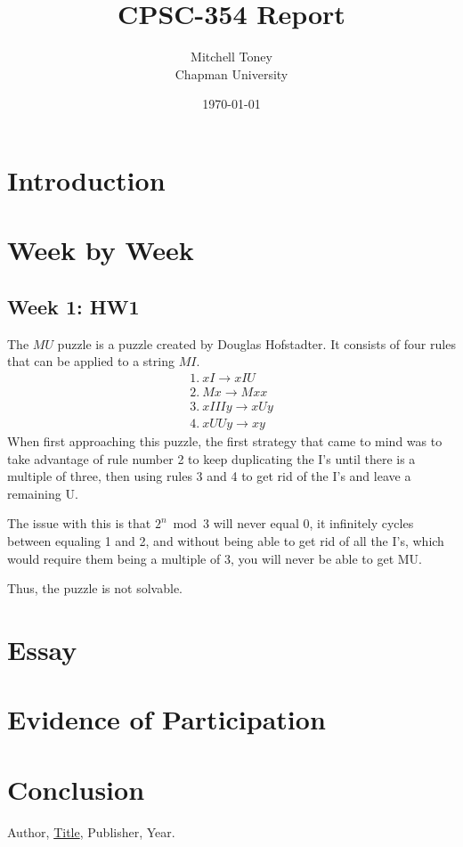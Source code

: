 \documentclass{article}
\title{CPSC-354 Report}
\author{Mitchell Toney  \\ Chapman University}
\date{\today}
\theoremstyle{theorem}
\theoremstyle{definition}
\theoremstyle{remark}
\begin{document}
\maketitle

\begin{abstract}
\end{abstract}

\setcounter{tocdepth}{3}
\tableofcontents

\section{Introduction}\label{intro}

\section{Week by Week}\label{homework}

\subsection{Week 1: HW1}
The $MU$ puzzle is a puzzle created by Douglas Hofstadter. It consists of four rules that can be applied to a string $MI$.
\[
\begin{array}{l}
1.\ xI \rightarrow xIU \\
2.\ Mx \rightarrow Mxx \\
3.\ xIIIy \rightarrow xUy \\
4.\ xUUy \rightarrow xy 
\end{array}
\]
When first approaching this puzzle, the first strategy that came to mind was to take advantage of rule number 2 to keep duplicating the I's until there is a multiple of three, then using rules 3 and 4 to get rid of the I's and leave a remaining U.

The issue with this is that $2^{n}\bmod 3$ will never equal 0, it infinitely cycles between equaling 1 and 2, and without being able to get rid of all the I's, which would require them being a multiple of 3, you will never be able to get MU.

Thus, the puzzle is not solvable.
\section{Essay}

\section{Evidence of Participation}

\section{Conclusion}\label{conclusion}

\begin{thebibliography}{99}
 Author, \href{https://en.wikipedia.org/wiki/LaTeX}{Title}, Publisher, Year.
\end{thebibliography}
\end{document}
